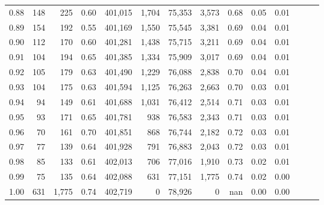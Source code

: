 \begin{tabular}{rrrrrrrrrrrrrr}
0.88 &     148 &    225 &  0.60 &  401,015 &    1,704 &  75,353 &   3,573 &  0.68 &  0.05 &      0.01 \\
0.89 &     154 &    192 &  0.55 &  401,169 &    1,550 &  75,545 &   3,381 &  0.69 &  0.04 &      0.01 \\
0.90 &     112 &    170 &  0.60 &  401,281 &    1,438 &  75,715 &   3,211 &  0.69 &  0.04 &      0.01 \\
0.91 &     104 &    194 &  0.65 &  401,385 &    1,334 &  75,909 &   3,017 &  0.69 &  0.04 &      0.01 \\
0.92 &     105 &    179 &  0.63 &  401,490 &    1,229 &  76,088 &   2,838 &  0.70 &  0.04 &      0.01 \\
0.93 &     104 &    175 &  0.63 &  401,594 &    1,125 &  76,263 &   2,663 &  0.70 &  0.03 &      0.01 \\
0.94 &      94 &    149 &  0.61 &  401,688 &    1,031 &  76,412 &   2,514 &  0.71 &  0.03 &      0.01 \\
0.95 &      93 &    171 &  0.65 &  401,781 &      938 &  76,583 &   2,343 &  0.71 &  0.03 &      0.01 \\
0.96 &      70 &    161 &  0.70 &  401,851 &      868 &  76,744 &   2,182 &  0.72 &  0.03 &      0.01 \\
0.97 &      77 &    139 &  0.64 &  401,928 &      791 &  76,883 &   2,043 &  0.72 &  0.03 &      0.01 \\
0.98 &      85 &    133 &  0.61 &  402,013 &      706 &  77,016 &   1,910 &  0.73 &  0.02 &      0.01 \\
0.99 &      75 &    135 &  0.64 &  402,088 &      631 &  77,151 &   1,775 &  0.74 &  0.02 &      0.00 \\
1.00 &     631 &  1,775 &  0.74 &  402,719 &        0 &  78,926 &       0 &   nan &  0.00 &      0.00 \\
\bottomrule
\end{tabular}
